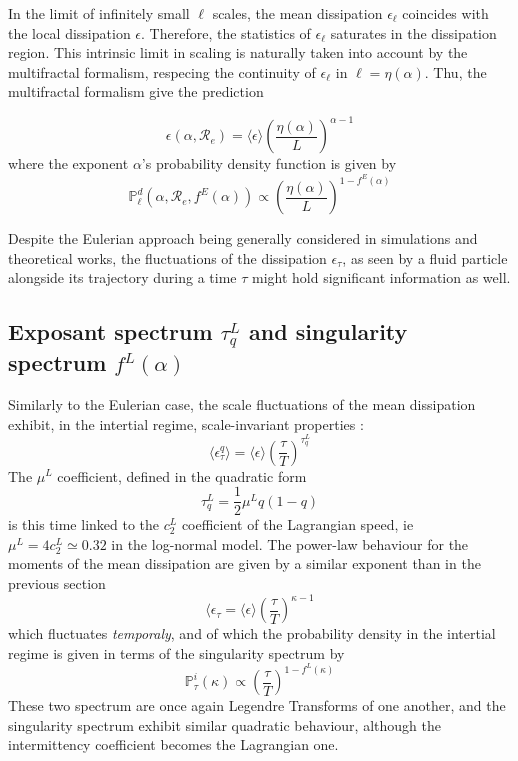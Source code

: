 In the limit of infinitely small $\ell$ scales, the mean dissipation $\epsilon_\ell$ coincides with the local dissipation $\epsilon$. Therefore, the statistics of $\epsilon_\ell$ saturates in the dissipation region. This intrinsic limit in scaling is naturally taken into account by the multifractal formalism, respecing the continuity of $\epsilon_\ell$ in $\ell=\eta(\alpha)$.
Thu, the multifractal formalism give the prediction

\begin{equation}
    \epsilon(\alpha,\mathcal{R}_e)=\langle\epsilon\rangle\left(\frac{\eta(\alpha)}{L}\right)^{\alpha-1}
\end{equation}
where the exponent $\alpha$'s probability density function is given by
\begin{equation}
    \mathbb{P}_\ell^d(\alpha,\mathcal{R}_e,f^E(\alpha))\propto\left(\frac{\eta(\alpha)}{L}\right)^{1-f^E(\alpha)}
\end{equation}

Despite the Eulerian approach being generally considered in simulations and theoretical works, the fluctuations of the dissipation $\epsilon_\tau$, as seen by a fluid particle alongside its trajectory during a time $\tau$ might hold significant information as well.
\subsection{Exposant spectrum $\tau_q^L$ and singularity spectrum $f^L(\alpha)$}
Similarly to the Eulerian case, the scale fluctuations of the mean dissipation exhibit, in the intertial regime, scale-invariant properties : 
\begin{equation}
    \langle\epsilon_\tau^q\rangle=\langle\epsilon\rangle\left(\frac{\tau}{T}\right)^{\tau_q^L}
\end{equation}
The $\mu^L$ coefficient, defined in the quadratic form 
\begin{equation}
    \tau_q^L=\frac{1}{2}\mu^Lq(1-q)
\end{equation}
is this time linked to the $c_2^L$ coefficient of the Lagrangian speed, ie $\mu^L=4c_2^L\simeq0.32$ in the log-normal model. 
The power-law behaviour for the moments of the mean dissipation are given by a similar exponent than in the previous section
\begin{equation}
    \langle\epsilon_\tau=\langle\epsilon\rangle\left(\frac{\tau}{T}\right)^{\kappa-1}
\end{equation}
which fluctuates \emph{temporaly}, and of which the probability density in the intertial regime is given in terms of the singularity spectrum by
\begin{equation}
    \mathbb{P}^i_\tau(\kappa)\propto\left(\frac{\tau}{T}\right)^{1-f^L(\kappa)}
\end{equation}
These two spectrum are once again Legendre Transforms of one another, and the singularity spectrum exhibit similar quadratic behaviour, although the intermittency coefficient becomes the Lagrangian one. 

